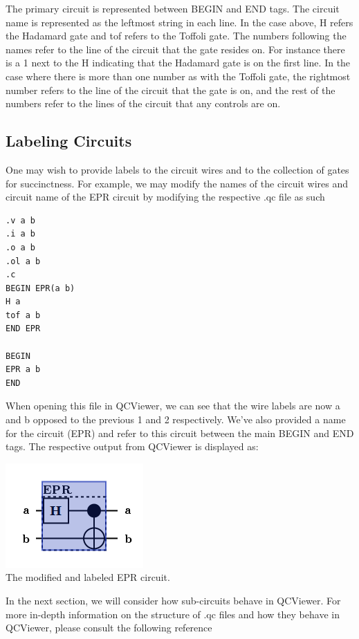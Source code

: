 \documentclass[10pt]{article}
\theoremstyle{definition}
\begin{document}
The primary circuit is represented between BEGIN and END tags. The circuit name is represented as the leftmost string in each line. In the case above, H refers the Hadamard gate and tof refers to the Toffoli gate. The numbers following the names refer to the line of the circuit that the gate resides on. For instance there is a 1 next to the H indicating that the Hadamard gate is on the first line. In the case where there is more than one number as with the Toffoli gate, the rightmost number refers to the line of the circuit that the gate is on, and the rest of the numbers refer to the lines of the circuit that any controls are on.

\subsection{Labeling Circuits}\label{sec:LabelingCircuits}

One may wish to provide labels to the circuit wires and to the collection of gates for succinctness. For example, we may modify the names of the circuit wires and circuit name of the EPR circuit by modifying the respective .qc file as such

\small
\begin{verbatim}
.v a b
.i a b
.o a b
.ol a b
.c
BEGIN EPR(a b)
H a
tof a b
END EPR

BEGIN
EPR a b
END
\end{verbatim}
\normalsize

When opening this file in QCViewer, we can see that the wire labels are now a and b opposed to the previous 1 and 2 respectively. We've also provided a name for the circuit (EPR) and refer to this circuit between the main BEGIN and END tags. The respective output from QCViewer is displayed as:

\begin{center}
\includegraphics[scale=.7]{Figures/QCFiles/EPRCircuitLabel} \\
The modified and labeled EPR circuit.
\end{center}

In the next section, we will consider how sub-circuits behave in QCViewer. For more in-depth information on the structure of .qc files and how they behave in QCViewer, please consult the following reference~\cite{Parent2011Quantum}
\end{document}
